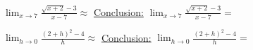 \documentclass[]{exam}
\numberwithin{equation}{section}
\begin{document}
\begin{questions}
\begin{parts}
\begin{subparts}
		\subpart $\displaystyle \lim_{x\to 7} \frac{\sqrt{x+2} - 3}{x-7}\approx$ \hspace{6.2cm} \underline{Conclusion:} $\displaystyle  \lim_{x\to 7} \frac{\sqrt{x+2} - 3}{x-7}= $ \vfill
		
		\subpart $\displaystyle  \lim_{h\to 0} \frac{ (2 + h)^2 - 4}{h}\approx$ \hspace{6.1cm} \underline{Conclusion:} $\displaystyle  \lim_{h\to 0} \frac{ (2 + h)^2 - 4}{h}= $ \vfill
				

	
\end{subparts}


\end{parts}



\pagebreak







\end{questions}
\end{document}
